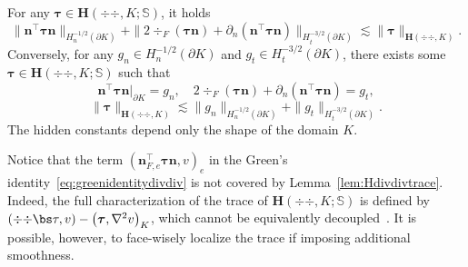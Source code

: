 
\begin{lemma}\label{lem:Hdivdivtrace}
For any $\boldsymbol \tau\in\boldsymbol{H}(\div{\div },K; \mathbb{S})$,  it holds
\[
\|\boldsymbol  n^{\intercal}\boldsymbol \tau\boldsymbol  n\|_{H_n^{-1/2}(\partial K)} + \|2\div_F(\boldsymbol\tau \boldsymbol n)+ \partial_n(\boldsymbol n^{\intercal} \boldsymbol \tau\boldsymbol n)\|_{H_t^{-3/2}(\partial K)}\lesssim \|\boldsymbol{\tau}\|_{\boldsymbol{H}(\div{\div },K)}.
\]
Conversely, for any $g_n\in H_n^{-1/2}(\partial K)$ and $g_t\in H_t^{-3/2}(\partial K)$, there exists some $\boldsymbol \tau\in\boldsymbol{H}(\div{\div },K; \mathbb{S})$ such that
\[
\boldsymbol  n^{\intercal}\boldsymbol \tau\boldsymbol  n|_{\partial K}=g_n, \quad 2\div_F(\boldsymbol\tau \boldsymbol n)+ \partial_n(\boldsymbol n^{\intercal} \boldsymbol \tau\boldsymbol n)=g_t,
\]
\[ 
\|\boldsymbol{\tau}\|_{\boldsymbol{H}(\div{\div },K)} \lesssim \|g_n\|_{H_n^{-1/2}(\partial K)}+\|g_t\|_{H_t^{-3/2}(\partial K)}.
\]
The hidden constants depend only the shape of the domain $K$.
\end{lemma}

Notice that the term $(\boldsymbol n_{F,e}^{\intercal}\boldsymbol \tau \boldsymbol n, v)_e$ in the Green's identity~\eqref{eq:greenidentitydivdiv} is not covered by Lemma~\ref{lem:Hdivdivtrace}.
Indeed, the full characterization of the trace of $\boldsymbol{H}(\div{\div },K; \mathbb{S})$ is defined by $(\div{\div }\bs\tau, v)-\left(\boldsymbol  \tau, \nabla^{2} v\right)_{K}$, which cannot be equivalently decoupled~\cite[Lemma~3.2]{Fuhrer;Heuer;Niemi:2019ultraweak}.
It is possible, however, to face-wisely localize the trace if imposing additional smoothness. 

